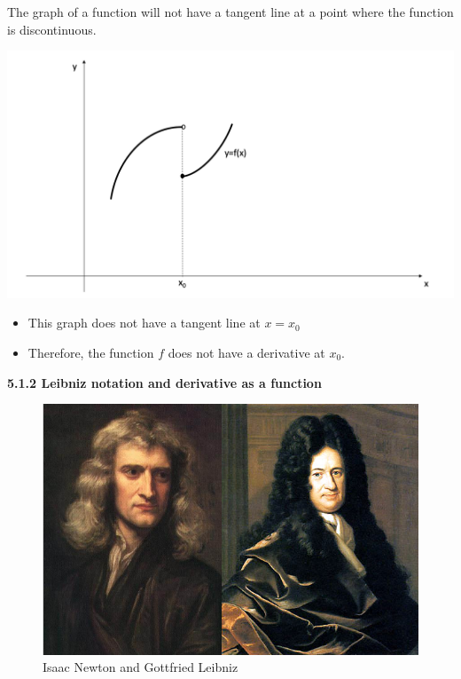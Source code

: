 \documentclass[]{book}
\providecommand{\tightlist}{%
  \setlength{\itemsep}{0pt}\setlength{\parskip}{0pt}}
\begin{document}
\newpage

The graph of a function will not have a tangent line at a point where the function is discontinuous.

\begin{center}\includegraphics[width=1\linewidth]{figure/5Derivatives-5} \end{center}

\begin{itemize}
\tightlist
\item
  This graph does not have a tangent line at \(x=x_{0}\)
\item
  Therefore, the function \(f\) does not have a derivative at \(x_{0}\).
\end{itemize}

\newpage

\textbf{5.1.2 Leibniz notation and derivative as a function}

\begin{figure}

{\centering \includegraphics[width=1\linewidth]{figure/5Derivatives-13} 

}

\caption{Isaac Newton and Gottfried Leibniz}\label{fig:unnamed-chunk-10}
\end{figure}
\end{document}
